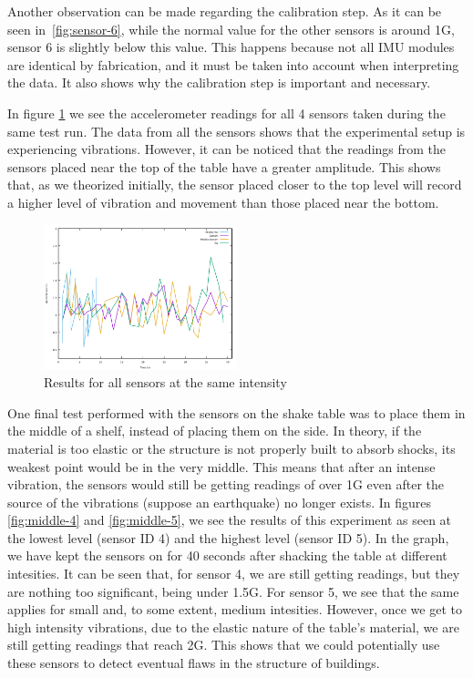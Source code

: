 Another observation can be made regarding the calibration step. As it can be seen in~\ref{fig:sensor-6}, while the normal value for the other sensors is around 1G, sensor 6 is
slightly below this value. This happens because not all IMU modules are identical by fabrication, and it must be taken into account when interpreting the data. It also shows 
why the calibration step is important and necessary.

In figure \ref{fig:same-level} we see the accelerometer readings for all 4 sensors taken during the same test run. The data from all the sensors shows 
that the experimental setup is experiencing vibrations. However, it can be noticed that the readings from the sensors placed near the top of the table have a 
greater amplitude. This shows that, as we theorized initially, the sensor placed closer to the top level will record a higher level of vibration and movement than 
those placed near the bottom.

\begin{figure}[ht] \centering
  \includegraphics[width=0.5\textwidth]{img/same-level-data}
  \caption{Results for all sensors at the same intensity}
  \label{fig:same-level}
\end{figure}

One final test performed with the sensors on the shake table was to place them in the middle of a shelf, instead of placing them on the side. In theory, if the material is too elastic 
or the structure is not properly built to absorb shocks, its weakest point would be in the very middle. This means that after an intense vibration, the sensors would still be getting 
readings of over 1G even after the source of the vibrations (suppose an earthquake) no longer exists. In figures \ref{fig:middle-4} and \ref{fig:middle-5}, we see the results of this 
experiment as seen at the lowest level (sensor ID 4) and the highest level (sensor ID 5). In the graph, we have kept the sensors on for 40 seconds after shacking the table at different 
intesities. It can be seen that, for sensor 4, we are still getting readings, but they are nothing too significant, being under 1.5G. For sensor 5, we see that the same applies for small 
and, to some extent, medium intesities. However, once we get to high intensity vibrations, due to the elastic nature of the table's material, we are still getting readings that reach 2G.
This shows that we could potentially use these sensors to detect eventual flaws in the structure of buildings.

